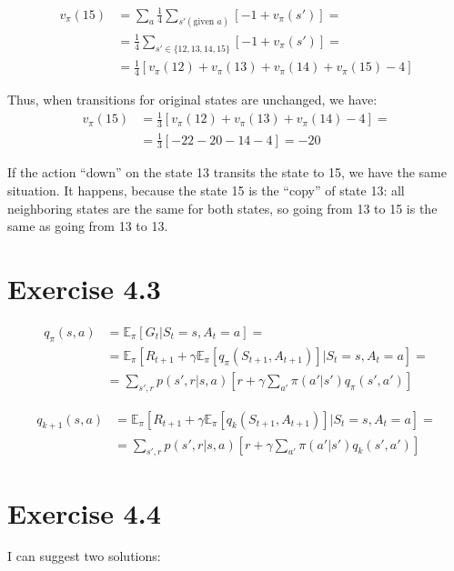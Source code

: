 \documentclass[12pt]{article}
\begin{document}
        \begin{align*}
            v_\pi(15) &= \sum\limits_a \frac{1}{4} \sum\limits_{s' (\text{given }a)} [-1 + v_\pi(s')] =\\
            &= \frac{1}{4} \sum\limits_{s' \in \{12, 13, 14, 15\}} [-1 + v_\pi(s')] =\\
            &= \frac{1}{4} [v_\pi(12) + v_\pi(13) + v_\pi(14) + v_\pi(15) - 4]
        \end{align*}

        Thus, when transitions for original states are unchanged, we have:
        \begin{align*}
            v_\pi(15) &= \frac{1}{3} [v_\pi(12) + v_\pi(13) + v_\pi(14) - 4] =\\
            & = \frac{1}{3}[-22-20-14-4] = -20
        \end{align*}

        If the action ``down'' on the state 13 transits the state to 15, we have the same situation.
        It happens, because the state 15 is the ``copy'' of state 13: all neighboring states are the
        same for both states, so going from 13 to 15 is the same as going from 13 to 13.

    \section{Exercise 4.3}
        \begin{align*}
            q_\pi(s,a) &= \mathbb{E}_\pi[G_t|S_t=s,A_t=a] =\\
            &= \mathbb{E}_\pi[R_{t+1} + \gamma \mathbb{E}_\pi[q_\pi(S_{t+1},A_{t+1})]
            |S_t=s,A_t=a] =\\
            &= \sum\limits_{s',r} p(s',r|s,a)[r +
            \gamma \sum\limits_{a'} \pi(a'|s') q_\pi(s',a')]
        \end{align*}

        \begin{align*}
            q_{k+1}(s,a) &= \mathbb{E}_\pi[R_{t+1} +
            \gamma \mathbb{E}_\pi[q_k(S_{t+1},A_{t+1})]
            |S_t=s,A_t=a] =\\
            &= \sum\limits_{s',r} p(s',r|s,a)[r +
            \gamma \sum\limits_{a'} \pi(a'|s') q_k(s',a')]
        \end{align*}

    \section{Exercise 4.4}
        I can suggest two solutions:
\end{document}
